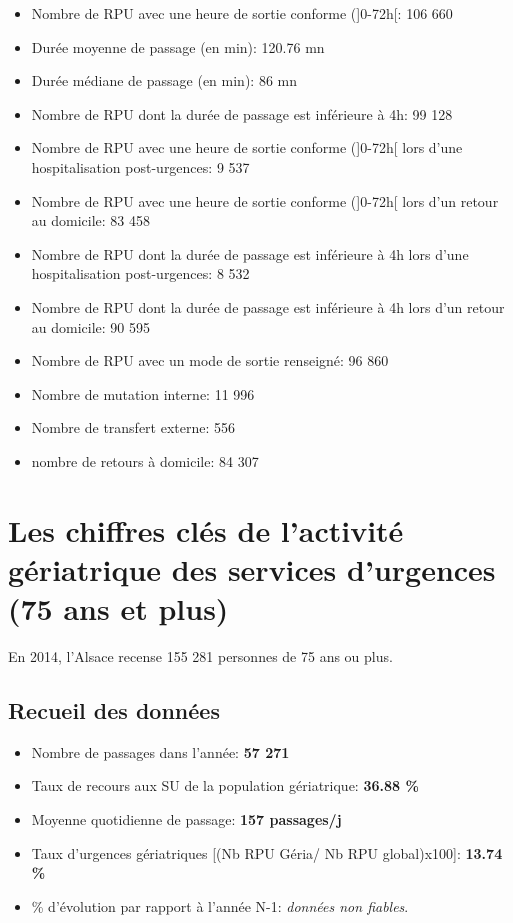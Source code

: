 \documentclass[]{article}
\begin{document}
\begin{itemize}
\item
  Nombre de RPU avec une heure de sortie conforme ({]}0-72h{[}: 106 660
\item
  Durée moyenne de passage (en min): 120.76 mn
\item
  Durée médiane de passage (en min): 86 mn
\item
  Nombre de RPU dont la durée de passage est inférieure à 4h: 99 128
\item
  Nombre de RPU avec une heure de sortie conforme ({]}0-72h{[} lors
  d'une hospitalisation post-urgences: 9 537
\item
  Nombre de RPU avec une heure de sortie conforme ({]}0-72h{[} lors d'un
  retour au domicile: 83 458
\item
  Nombre de RPU dont la durée de passage est inférieure à 4h lors d'une
  hospitalisation post-urgences: 8 532
\item
  Nombre de RPU dont la durée de passage est inférieure à 4h lors d'un
  retour au domicile: 90 595
\item
  Nombre de RPU avec un mode de sortie renseigné: 96 860
\item
  Nombre de mutation interne: 11 996
\item
  Nombre de transfert externe: 556
\item
  nombre de retours à domicile: 84 307
\end{itemize}

\section{Les chiffres clés de l'activité gériatrique des services
d'urgences (75 ans et
plus)}\label{les-chiffres-cles-de-lactivite-geriatrique-des-services-durgences-75-ans-et-plus}

En 2014, l'Alsace recense 155 281 personnes de 75 ans ou plus.

\subsection{Recueil des données}\label{recueil-des-donnees-2}

\begin{itemize}
\itemsep1pt\parskip0pt
\item
  Nombre de passages dans l'année: \textbf{57 271}
\item
  Taux de recours aux SU de la population gériatrique: \textbf{36.88 \%}
\item
  Moyenne quotidienne de passage: \textbf{157 passages/j}
\item
  Taux d'urgences gériatriques {[}(Nb RPU Géria/ Nb RPU global)x100{]}:
  \textbf{13.74 \%}
\item
  \% d'évolution par rapport à l'année N-1: \emph{données non fiables}.
\end{itemize}
\end{document}
